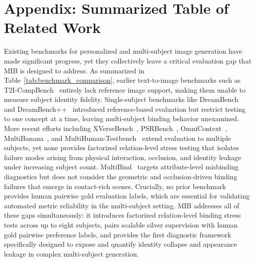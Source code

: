 \documentclass{article}
\begin{document}
\section{Appendix: Summarized Table of Related Work}
\label{sec:appendix_related_work}
Existing benchmarks for personalized and multi-subject image generation have made significant progress, yet they collectively leave a critical evaluation gap that MIB is designed to address.
As summarized in Table~\ref{tab:benchmark_comparison}, earlier text-to-image benchmarks such as T2I-CompBench~\cite{huang2023t2i} entirely lack reference image support, making them unable to measure subject identity fidelity.
Single-subject benchmarks like DreamBench~\cite{ruiz2023dreambooth} and DreamBench++~\cite{peng2024dreambench} introduced reference-based evaluation but restrict testing to one concept at a time, leaving multi-subject binding behavior unexamined.
More recent efforts including XVerseBench~\cite{chen2025xverse}, PSRBench~\cite{wang2025psr}, OmniContext~\cite{wu2025omnigen2}, MultiBanana~\cite{oshima2025multibanana}, and MultiHuman-Testbench~\cite{borse2025multihuman} extend evaluation to multiple subjects, yet none provides factorized relation-level stress testing that isolates failure modes arising from physical interaction, occlusion, and identity leakage under increasing subject count.
MultiBind~\cite{tian2026multibind} targets attribute-level misbinding diagnostics but does not consider the geometric and occlusion-driven binding failures that emerge in contact-rich scenes.
Crucially, no prior benchmark provides human pairwise gold evaluation labels, which are essential for validating automated metric reliability in the multi-subject setting.
MIB addresses all of these gaps simultaneously: it introduces factorized relation-level binding stress tests across up to eight subjects, pairs scalable silver supervision with human gold pairwise preference labels, and provides the first diagnostic framework specifically designed to expose and quantify identity collapse and appearance leakage in complex multi-subject generation.
\end{document}
